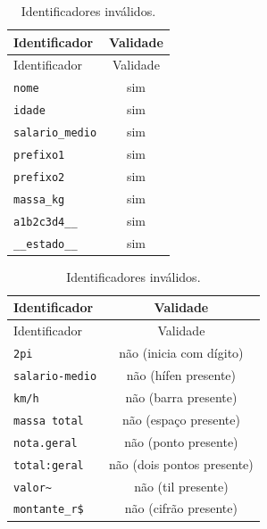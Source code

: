 \documentclass[
  11pt,
  a4paper,
]{scrbook}
\begin{document}
\begin{table}

\caption{\label{tbl-identificadores-e-validades}Identificadores e sua
validade.}

\begin{minipage}{0.50\linewidth}

\begin{longtable}[]{@{}lc@{}}
\caption{Identificadores válidos.}\tabularnewline
\toprule\noalign{}
Identificador & Validade \\
\midrule\noalign{}
\endfirsthead
\toprule\noalign{}
Identificador & Validade \\
\midrule\noalign{}
\endhead
\bottomrule\noalign{}
\endlastfoot
\texttt{nome} & sim \\
\texttt{idade} & sim \\
\texttt{salario\_medio} & sim \\
\texttt{prefixo1} & sim \\
\texttt{prefixo2} & sim \\
\texttt{massa\_kg} & sim \\
\texttt{a1b2c3d4\_\_} & sim \\
\texttt{\_\_estado\_\_} & sim \\
\end{longtable}

\end{minipage}%
%
\begin{minipage}{0.50\linewidth}

\begin{longtable}[]{@{}lc@{}}
\caption{Identificadores inválidos.}\tabularnewline
\toprule\noalign{}
Identificador & Validade \\
\midrule\noalign{}
\endfirsthead
\toprule\noalign{}
Identificador & Validade \\
\midrule\noalign{}
\endhead
\bottomrule\noalign{}
\endlastfoot
\texttt{2pi} & não (inicia com dígito) \\
\texttt{salario-medio} & não (hífen presente) \\
\texttt{km/h} & não (barra presente) \\
\texttt{massa\ total} & não (espaço presente) \\
\texttt{nota.geral} & não (ponto presente) \\
\texttt{total:geral} & não (dois pontos presente) \\
\texttt{valor\textasciitilde{}} & não (til presente) \\
\texttt{montante\_r\$} & não (cifrão presente) \\
\end{longtable}

\end{minipage}%

\end{table}%
\end{document}
